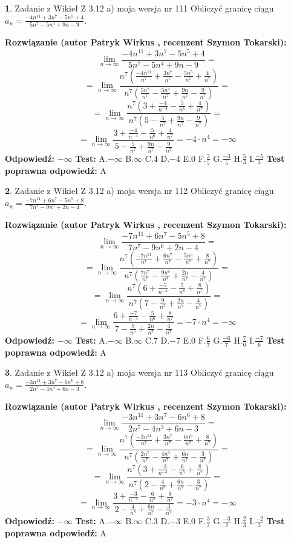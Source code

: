 \documentclass[12pt, a4paper]{article}
\theoremstyle{definition} %
\newtheorem{zad}{}
\newcommand{\zadStart}[1]{\begin{zad}#1\newline}
\newcommand{\zadStop}{\end{zad}}
\newcommand{\rozwStart}[2]{\noindent \textbf{Rozwiązanie (autor #1 , recenzent #2): }\newline}
\newcommand{\rozwStop}{\newline}
\newcommand{\odpStart}{\noindent \textbf{Odpowiedź:}\newline}
\newcommand{\odpStop}{\newline}
\newcommand{\testStart}{\noindent \textbf{Test:}\newline}
\newcommand{\testStop}{\newline}
\newcommand{\kluczStart}{\noindent \textbf{Test poprawna odpowiedź:}\newline}
\newcommand{\kluczStop}{\newline}
\begin{document}
\zadStart{Zadanie z Wikieł Z 3.12 a) moja wersja nr 111}
Obliczyć granicę ciągu $a_{n}=\frac{-4n^{11}+3n^{7}-5n^{5}+4}{5n^{7}-5n^{4}+9n-9}$.
\zadStop
\rozwStart{Patryk Wirkus}{Szymon Tokarski}
$$\lim\limits_{n\to\infty}\frac{-4n^{11}+3n^{7}-5n^{5}+4}{5n^{7}-5n^{4}+9n-9}=$$
$$=\lim\limits_{n\to\infty}\frac{n^{7}\left(\frac{-4n^{11}}{n^{7}}+\frac{3n^{7}}{n^{7}}-\frac{5n^{5}}{n^{7}}+\frac{4}{n^{7}}\right)}{n^{7}\left(\frac{5n^{7}}{n^{7}}-\frac{5n^{4}}{n^{7}}+\frac{9n}{n^{7}}-\frac{9}{n^{7}}\right)}=$$
$$=\lim\limits_{n\to\infty}\frac{n^{7}\left(3+\frac{-4}{n^{-4}}-\frac{5}{n^{6}}+\frac{4}{n^{7}}\right)}
{n^{7}\left(5-\frac{5}{n^{7}}+\frac{9n}{n^{7}}-\frac{9}{n^{7}}\right)}=$$
$$=\lim\limits_{n\to\infty}\frac{3+\frac{-4}{n^{-4}}-\frac{5}{n^{6}}+\frac{4}{n^{7}}}{5-\frac{5}{n^{7}}+\frac{9n}{n^{7}}-\frac{9}{n^{7}}}=-4\cdot n^{4} = -\infty$$
\rozwStop
\odpStart
$-\infty$
\odpStop
\testStart
A.$-\infty$
B.$\infty$
C.$4$
D.$-4$
E.$0$
F.$\frac{3}{5}$
G.$\frac{-3}{5}$
H.$\frac{5}{3}$
I.$\frac{-5}{3}$
\testStop
\kluczStart
A
\kluczStop



\zadStart{Zadanie z Wikieł Z 3.12 a) moja wersja nr 112}
Obliczyć granicę ciągu $a_{n}=\frac{-7n^{11}+6n^{7}-5n^{5}+8}{7n^{7}-9n^{6}+2n-4}$.
\zadStop
\rozwStart{Patryk Wirkus}{Szymon Tokarski}
$$\lim\limits_{n\to\infty}\frac{-7n^{11}+6n^{7}-5n^{5}+8}{7n^{7}-9n^{6}+2n-4}=$$
$$=\lim\limits_{n\to\infty}\frac{n^{7}\left(\frac{-7n^{11}}{n^{7}}+\frac{6n^{7}}{n^{7}}-\frac{5n^{5}}{n^{7}}+\frac{8}{n^{7}}\right)}{n^{7}\left(\frac{7n^{7}}{n^{7}}-\frac{9n^{6}}{n^{7}}+\frac{2n}{n^{7}}-\frac{4}{n^{7}}\right)}=$$
$$=\lim\limits_{n\to\infty}\frac{n^{7}\left(6+\frac{-7}{n^{-4}}-\frac{5}{n^{6}}+\frac{8}{n^{7}}\right)}
{n^{7}\left(7-\frac{9}{n^{5}}+\frac{2n}{n^{7}}-\frac{4}{n^{7}}\right)}=$$
$$=\lim\limits_{n\to\infty}\frac{6+\frac{-7}{n^{-4}}-\frac{5}{n^{6}}+\frac{8}{n^{7}}}{7-\frac{9}{n^{5}}+\frac{2n}{n^{7}}-\frac{4}{n^{7}}}=-7\cdot n^{4} = -\infty$$
\rozwStop
\odpStart
$-\infty$
\odpStop
\testStart
A.$-\infty$
B.$\infty$
C.$7$
D.$-7$
E.$0$
F.$\frac{6}{7}$
G.$\frac{-6}{7}$
H.$\frac{7}{6}$
I.$\frac{-7}{6}$
\testStop
\kluczStart
A
\kluczStop



\zadStart{Zadanie z Wikieł Z 3.12 a) moja wersja nr 113}
Obliczyć granicę ciągu $a_{n}=\frac{-3n^{11}+3n^{7}-6n^{6}+8}{2n^{7}-4n^{3}+6n-3}$.
\zadStop
\rozwStart{Patryk Wirkus}{Szymon Tokarski}
$$\lim\limits_{n\to\infty}\frac{-3n^{11}+3n^{7}-6n^{6}+8}{2n^{7}-4n^{3}+6n-3}=$$
$$=\lim\limits_{n\to\infty}\frac{n^{7}\left(\frac{-3n^{11}}{n^{7}}+\frac{3n^{7}}{n^{7}}-\frac{6n^{6}}{n^{7}}+\frac{8}{n^{7}}\right)}{n^{7}\left(\frac{2n^{7}}{n^{7}}-\frac{4n^{3}}{n^{7}}+\frac{6n}{n^{7}}-\frac{3}{n^{7}}\right)}=$$
$$=\lim\limits_{n\to\infty}\frac{n^{7}\left(3+\frac{-3}{n^{-4}}-\frac{6}{n^{5}}+\frac{8}{n^{7}}\right)}
{n^{7}\left(2-\frac{4}{n^{8}}+\frac{6n}{n^{7}}-\frac{3}{n^{7}}\right)}=$$
$$=\lim\limits_{n\to\infty}\frac{3+\frac{-3}{n^{-4}}-\frac{6}{n^{5}}+\frac{8}{n^{7}}}{2-\frac{4}{n^{8}}+\frac{6n}{n^{7}}-\frac{3}{n^{7}}}=-3\cdot n^{4} = -\infty$$
\rozwStop
\odpStart
$-\infty$
\odpStop
\testStart
A.$-\infty$
B.$\infty$
C.$3$
D.$-3$
E.$0$
F.$\frac{3}{2}$
G.$\frac{-3}{2}$
H.$\frac{2}{3}$
I.$\frac{-2}{3}$
\testStop
\kluczStart
A
\kluczStop
\end{document}
